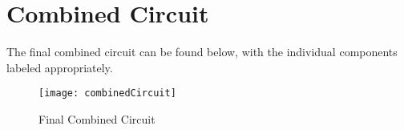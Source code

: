 \graphicspath{{content/4_implementation/figures/}}
\section{Combined Circuit}

The final combined circuit can be found below, with the individual components labeled appropriately.

\begin{figure}[!htb]
    \centering
    \texttt{[image: combinedCircuit]}
    \caption{Final Combined Circuit}
  \end{figure}